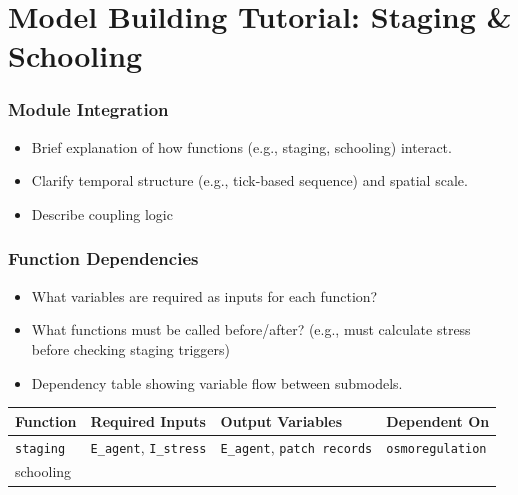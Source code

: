 \documentclass[
]{book}
\providecommand{\tightlist}{%
  \setlength{\itemsep}{0pt}\setlength{\parskip}{0pt}}
\begin{document}
\chapter{Model Building Tutorial: Staging \& Schooling}\label{model-building-tutorial-staging-schooling}

\subsection{Module Integration}\label{module-integration}

\begin{itemize}
\tightlist
\item
  Brief explanation of how functions (e.g., staging, schooling) interact.
\item
  Clarify temporal structure (e.g., tick-based sequence) and spatial scale.
\item
  Describe coupling logic
\end{itemize}

\subsection{Function Dependencies}\label{function-dependencies}

\begin{itemize}
\item
  What variables are required as inputs for each function?
\item
  What functions must be called before/after? (e.g., must calculate stress before checking staging triggers)
\item
  Dependency table showing variable flow between submodels.
\end{itemize}

\begin{longtable}[]{@{}
  >{\raggedright\arraybackslash}p{}
  >{\raggedright\arraybackslash}p{}
  >{\raggedright\arraybackslash}p{}
  >{\raggedright\arraybackslash}p{}@{}}
\toprule\noalign{}
\begin{minipage}[b]{\linewidth}\raggedright
Function
\end{minipage} & \begin{minipage}[b]{\linewidth}\raggedright
Required Inputs
\end{minipage} & \begin{minipage}[b]{\linewidth}\raggedright
Output Variables
\end{minipage} & \begin{minipage}[b]{\linewidth}\raggedright
Dependent On
\end{minipage} \\
\midrule\noalign{}
\endhead
\bottomrule\noalign{}
\endlastfoot
\texttt{staging} & \texttt{E\_agent}, \texttt{I\_stress} & \texttt{E\_agent}, \texttt{patch\ records} & \texttt{osmoregulation} \\
schooling & & & \\
\end{longtable}
\end{document}
